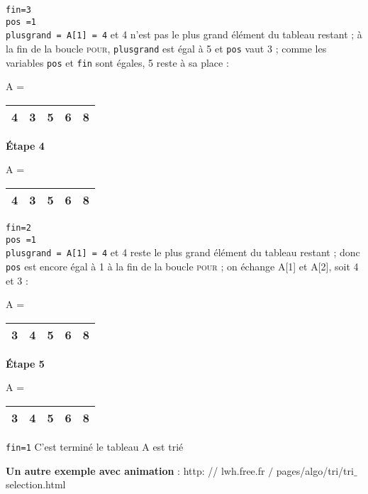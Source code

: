 \documentclass[a4paper,french]{article}
\begin{document}
{\texttt{fin=3}
\\
\texttt{pos =1}
\\
\texttt{plusgrand = A[1] = 4}  et 4 n'est pas le plus grand élément du tableau restant ; à la fin de la boucle \textsc{pour}, \texttt{plusgrand} est égal à 5 et \texttt{pos} vaut 3 ; comme les variables \texttt{pos} et \texttt{fin} sont égales, 5 reste à sa place :
\begin{center}
\setlength{\extrarowheight}{1mm}
A = \begin{tabular}{|c|c|c|c|c|}
\hline 
4 & 3 & \textbf{5} & 6 & 8 \\ 
\hline 
\end{tabular} 
\end{center}

\textbf{Étape 4} 
\begin{center}
\setlength{\extrarowheight}{1mm}
A = \begin{tabular}{|c|c|c|c|c|}
\hline 
\textbf{4} & 3 & 5 & 6 & 8 \\ 
\hline 
\end{tabular} 
\end{center}

\texttt{fin=2}
\\
\texttt{pos =1}
\\
\texttt{plusgrand = A[1] = 4}  et 4 reste le plus grand élément du tableau restant ; donc \texttt{pos} est encore égal à 1 à la fin de la boucle \textsc{pour} ; on échange A[1] et A[2], soit 4 et 3 :
\begin{center}
\setlength{\extrarowheight}{1mm}
A = \begin{tabular}{|c|c|c|c|c|}
\hline 
\textbf{3} & \textbf{4} & 5 & 6 & 8 \\ 
\hline 
\end{tabular} 
\end{center}

\textbf{Étape 5} 
\begin{center}
\setlength{\extrarowheight}{1mm}
A = \begin{tabular}{|c|c|c|c|c|}
\hline 
\textbf{3} & 4 & 5 & 6 & 8 \\ 
\hline 
\end{tabular} 
\end{center}

\texttt{fin=1} 
C'est terminé le tableau A est trié

\bigskip

\textbf{Un autre exemple avec animation} : 
http: // lwh.free.fr $/$ pages/algo/tri/tri$\_$ selection.html
\vspace*{5mm}

}
\end{document}
